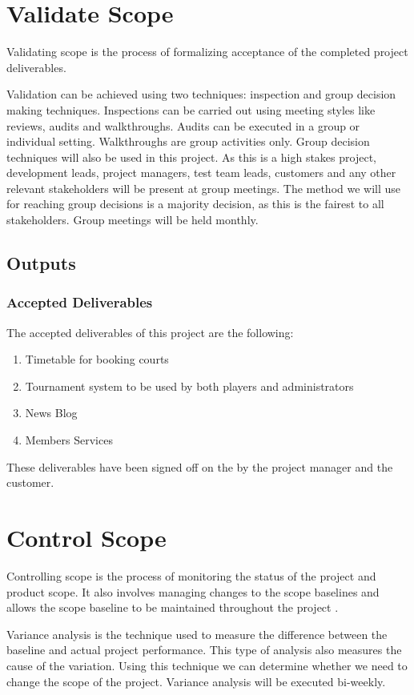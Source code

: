 \section{Validate Scope}

Validating scope is the process of formalizing acceptance of the completed project deliverables.

Validation can be achieved using two techniques: inspection and group decision making techniques. Inspections can be carried out using meeting styles like reviews, audits and walkthroughs. Audits can be executed in a group or individual setting. Walkthroughs are group activities only. Group decision techniques will also be used in this project. As this is a high stakes project, development leads, project managers, test team leads, customers and any other relevant stakeholders will be present at group meetings. The method we will use for reaching group decisions is a majority decision, as this is the fairest to all stakeholders. Group meetings will be held monthly.

\subsection{Outputs}

\subsubsection{Accepted Deliverables}

The accepted deliverables of this project are the following:
\begin{enumerate}
\item Timetable for booking courts
\item Tournament system to be used by both players and administrators
\item News Blog
\item Members Services
\end{enumerate}

These deliverables have been signed off on the by the project manager and the customer.

\section{Control Scope}

Controlling scope is the process of monitoring the status of the project and product scope. It also involves managing changes to the scope baselines and allows the scope baseline to be maintained throughout the project \parencite{pmbok}.

Variance analysis is the technique used to measure the difference between the baseline and actual project performance. This type of analysis also measures the cause of the variation. Using this technique we can determine whether we need to change the scope of the project. Variance analysis will be executed bi-weekly.
